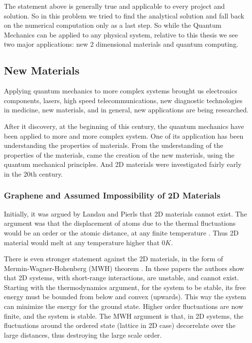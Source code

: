 The statement above is generally true and applicable to every project and solution. So in this problem we tried to find the analytical solution and fall back on the numerical computation only as a last step. So while the Quantum Mechanics can be applied to any physical system, relative to this thesis we see two major applications: new 2 dimensional materials and quantum computing.

\subsection*{New Materials}

Applying quantum mechanics to more complex systems brought us electronics components, lasers, high speed telecommunications, new diagnostic technologies in medicine, new materials, and in general, new applications are being researched.

After it discovery, at the beginning of this century, the quantum mechanics have been applied to more and more complex system. One of its application has been understanding the properties of materials.
From the understanding of the properties of the materials, came the creation of the new materials, using the quantum mechanical principles. And 2D materials were investigated fairly early in the 20th century.

\subsubsection{Graphene and Assumed Impossibility of 2D Materials}

Initially, it was argued by Landau and Pierls \cite{LandauG}\cite{Pierls} that 2D materials cannot exist. The argument was that the displacement of atoms due to the thermal fluctuations would be an order or the atomic distance, at any finite temperature \cite{LandauG, Pierls}. Thus 2D material would melt at any temperature higher that $ 0 K $. 

There is even stronger statement against the 2D materials, in the form of Mermin-Wagner-Hohenberg (MWH) theorem \cite{Hohenberg}\cite{Mermin2}. In these papers the authors show that 2D systems, with short-range interactions, are unstable, and cannot exist. 
Starting with the thermodynamics argument, for the system to be stable, its free energy must be bounded from below and convex (upwards). This way the system can minimize the energy for the ground state. Higher order fluctuations are now finite, and the system is stable.
The MWH argument is that, in 2D systems, the fluctuations around the ordered state (lattice in 2D case) decorrelate over the large distances, thus destroying the large scale order. 

